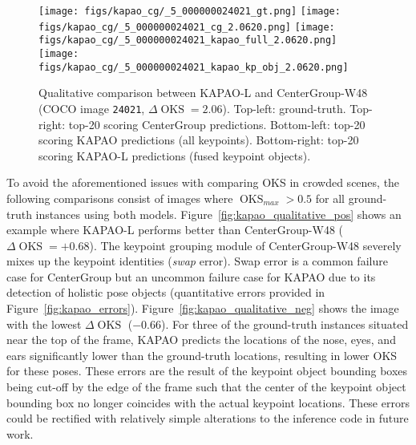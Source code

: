 \documentclass[runningheads]{llncs}
\DeclareMathOperator*{\oks}{OKS}
\begin{document}
\begin{figure}[t!]
\centering
    \texttt{[image: figs/kapao\_cg/\_5\_000000024021\_gt.png]}
    \texttt{[image: figs/kapao\_cg/\_5\_000000024021\_cg\_2.0620.png]}
    \texttt{[image: figs/kapao\_cg/\_5\_000000024021\_kapao\_full\_2.0620.png]}
    \texttt{[image: figs/kapao\_cg/\_5\_000000024021\_kapao\_kp\_obj\_2.0620.png]}
\caption[Qualitative comparison between KAPAO-L and CenterGroup-W48 (COCO image \texttt{24021}).]{Qualitative comparison between KAPAO-L and CenterGroup-W48 (COCO image \texttt{24021}, $\Delta\oks=2.06$). Top-left: ground-truth. Top-right: top-20 scoring CenterGroup predictions. Bottom-left: top-20 scoring KAPAO predictions (all keypoints). Bottom-right: top-20 scoring KAPAO-L predictions (fused keypoint objects).}
\label{fig:kapao_qualitative_crowd}
\end{figure}

To avoid the aforementioned issues with comparing OKS in crowded scenes, the following comparisons consist of images where $\oks_{max}>0.5$ for all ground-truth instances using both models. Figure~\ref{fig:kapao_qualitative_pos} shows an example where KAPAO-L performs better than CenterGroup-W48 ($\Delta\oks=+0.68$). The keypoint grouping module of CenterGroup-W48 severely mixes up the keypoint identities (\textit{swap} error). Swap error is a common failure case for CenterGroup but an uncommon failure case for KAPAO due to its detection of holistic pose objects (quantitative errors provided in Figure~\ref{fig:kapao_errors}). Figure~\ref{fig:kapao_qualitative_neg} shows the image with the lowest $\Delta\oks$ ($-0.66$). For three of the ground-truth instances situated near the top of the frame, KAPAO predicts the locations of the nose, eyes, and ears significantly lower than the ground-truth locations, resulting in lower OKS for these poses. These errors are the result of the keypoint object bounding boxes being cut-off by the edge of the frame such that the center of the keypoint object bounding box no longer coincides with the actual keypoint locations. These errors could be rectified with relatively simple alterations to the inference code in future work. 
\end{document}
